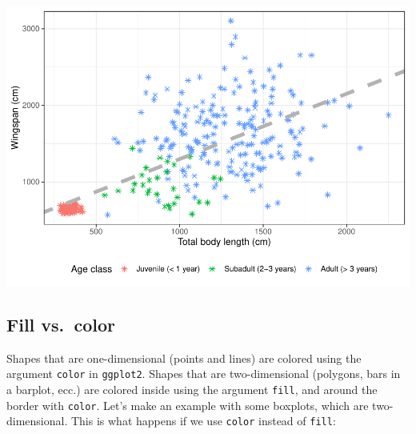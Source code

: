 \documentclass[
]{book}
\begin{document}
\includegraphics{reproducible-science_files/figure-latex/gg19-1.pdf}

\hypertarget{fill-vs.-color}{%
\subsection{Fill vs.~color}\label{fill-vs.-color}}

Shapes that are one-dimensional (points and lines) are colored using the
argument \texttt{color} in \texttt{ggplot2}. Shapes that are two-dimensional (polygons,
bars in a barplot, ecc.) are colored inside using the argument \texttt{fill}, and
around the border with \texttt{color}. Let's make an example with some boxplots, which
are two-dimensional. This is what happens if we use \texttt{color} instead of \texttt{fill}:
\end{document}
